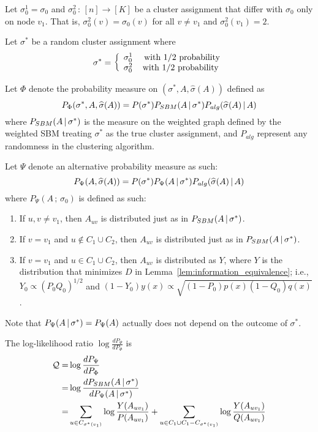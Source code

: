 \documentclass{article}
\begin{document}
Let $\sigma_0^1  = \sigma_0$ and $\sigma_0^2 \,:\, [n] \rightarrow [K]$ be a cluster assignment that differ with $\sigma_0$ only on node $v_1$. That is, $\sigma_0^2(v) = \sigma_0(v)$ for all $v \neq v_1$ and $\sigma_0^2(v_1) = 2$. 


Let $\sigma^*$ be a random cluster assignment where 
\[
\sigma^* = \left \{
     \begin{array}{cc}
     \sigma^1_0  &  \textrm{ with $1/2$ probability} \\
     \sigma^2_0 & \textrm{with $1/2$ probability}
    \end{array} \right.
\]


Let $\Phi$ denote the probability measure on $(\sigma^*, A, \hat{\sigma}(A))$ defined as
\[
P_{\Phi}(\sigma^*, A, \widehat{\sigma}(A)) = P(\sigma^*) P_{SBM}(A {\,|\,} \sigma^*) P_{alg}( \widehat{\sigma}(A) {\,|\,} A) 
\]
where $P_{SBM}( A {\,|\,} \sigma^*)$ is the measure on the weighted graph defined by the weighted SBM treating $\sigma^*$ as the true cluster assignment, and $P_{alg}$ represent any randomness in the clustering algorithm.


Let $\Psi$ denote an alternative probability measure as such:
\[
P_{\Psi} (A, \widehat{\sigma}(A)) = P(\sigma^*) P_{\Psi}(A  {\,|\,} \sigma^*) P_{alg}( \widehat{\sigma}(A) {\,|\,} A) 
\]
where $P_{\Psi}( A \,;\, \sigma_0)$ is defined as such:
\begin{enumerate}
\item If $u,v \neq v_1$, then $A_{uv}$ is distributed just as in $P_{SBM}( A {\,|\,} \sigma^*)$. 
\item If $v = v_1$ and $u \notin C_1 \cup C_2$, then $A_{uv}$ is distributed just as in $P_{SBM}( A {\,|\,} \sigma^*)$.
\item If $v = v_1$ and $u \in C_1 \cup C_2$, then $A_{uv}$ is distributed as $Y$, where $Y$ is the distribution that minimizes $D$ in Lemma~\ref{lem:information_equivalence}; i.e., $Y_0 \propto (P_0 Q_0)^{1/2}$ and $(1-Y_0) y(x) \propto \sqrt{(1-P_0)p(x)(1-Q_0) q(x)}$.
\end{enumerate}

Note that $P_{\Psi}(A {\,|\,} \sigma^*) = P_{\Psi}(A)$ actually does not depend on the outcome of $\sigma^*$. 



The log-likelihood ratio $\log \frac{d P_{\Psi} }{d P_{\Phi}}$ is 
\begin{align*}
\mathcal{Q} =& \log \frac{d P_{\Psi}}{d P_{\Phi}} \\
      = & \log \frac{ d P_{SBM}(A {\,|\,} \sigma^*)}{ d P_{\Psi} (A {\,|\,} \sigma^*)} \\
      =& \sum_{u \in C_{\sigma^*(v_1)}} \log \frac{Y(A_{u v_1})}{P(A_{u v_1})} + \sum_{u \in C_1 \cup C_1 - C_{\sigma^*(v_1)}  } \log \frac{Y(A_{u v_1})}{Q(A_{u v_1})}  
\end{align*}
\end{document}
